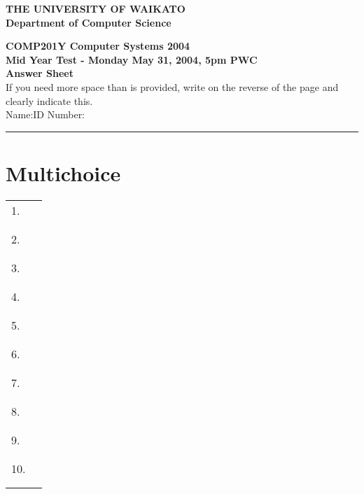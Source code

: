 \documentclass[a4paper,10pt]{article}
\begin{document}
\vspace*{-1cm} 

{\centering \large \bf THE UNIVERSITY OF WAIKATO\\}
{\centering \large \bf Department of Computer Science\\[0.5cm]}

{\centering \large \bf COMP201Y Computer Systems 2004 \\}
{\centering \large \bf Mid Year Test - Monday May 31, 2004, 5pm PWC\\[1cm]}
{\centering \large \bf Answer Sheet\\[5mm]}
If you need more space than is provided, write on the reverse of the
page and clearly indicate this.\\[5mm]
Name:\hspace*{5cm}ID Number:\\
\hrule

\section{Multichoice}

\begin{tabular}{p{1.5cm}|p{2cm}|}
\cline{2-2}
1. &  \\
& \\ & \\
\cline{2-2}
2. &  \\
& \\ & \\
\cline{2-2}
3. &  \\
& \\ & \\
\cline{2-2}
4. &  \\
& \\ & \\
\cline{2-2}
5. &  \\
& \\ & \\ 
\cline{2-2}
6. &  \\
& \\ & \\
\cline{2-2}
7. &  \\
& \\ & \\
\cline{2-2}
8. &  \\
& \\ & \\
\cline{2-2}
9. &  \\
& \\ & \\
\cline{2-2}
10. &  \\
& \\ & \\
\cline{2-2}
\end{tabular}
\end{document}
